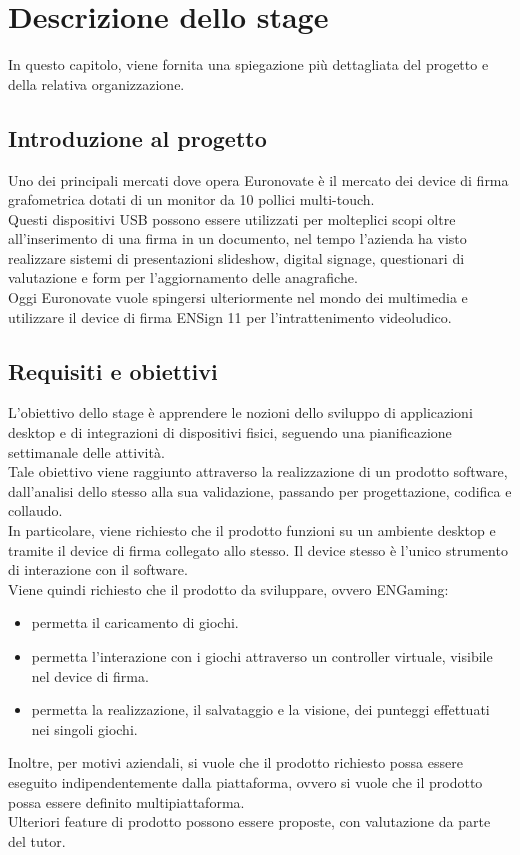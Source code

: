 \chapter{Descrizione dello stage}
\label{cap:descrizione-stage}

In questo capitolo, viene fornita una spiegazione più dettagliata del progetto e della relativa organizzazione.

\section{Introduzione al progetto}

Uno dei principali mercati dove opera Euronovate è il mercato dei device di firma grafometrica
dotati di un monitor da 10 pollici multi-touch.\\ Questi dispositivi USB possono essere utilizzati
per molteplici scopi oltre all'inserimento di una firma in un documento, nel tempo l'azienda ha visto
realizzare sistemi di presentazioni slideshow, digital signage, questionari di valutazione e form
per l'aggiornamento delle anagrafiche.\\ Oggi Euronovate vuole spingersi ulteriormente nel mondo dei
multimedia e utilizzare il device di firma ENSign 11 per l'intrattenimento videoludico.\\

\section{Requisiti e obiettivi}

L'obiettivo dello stage è apprendere le nozioni dello sviluppo di applicazioni desktop e di integrazioni di dispositivi fisici, seguendo una pianificazione
settimanale delle attività.\\
Tale obiettivo viene raggiunto attraverso la realizzazione di un prodotto software, dall'analisi dello stesso alla sua validazione, passando per progettazione, codifica e collaudo.\\
In particolare, viene richiesto che il prodotto funzioni su un ambiente desktop e tramite il device di firma collegato allo stesso. Il device stesso è l'unico strumento di interazione con il software.\\
Viene quindi richiesto che il prodotto da sviluppare, ovvero ENGaming:
\begin{itemize}
    \item permetta il caricamento di giochi.
    \item permetta l'interazione con i giochi attraverso un controller virtuale, visibile nel device di firma.
    \item permetta la realizzazione, il salvataggio e la visione, dei punteggi effettuati nei singoli giochi.
\end{itemize}
Inoltre, per motivi aziendali, si vuole che il prodotto richiesto possa essere eseguito indipendentemente dalla piattaforma, ovvero si vuole che il prodotto possa essere definito multipiattaforma.\\
Ulteriori feature di prodotto possono essere proposte, con valutazione da parte del tutor.

